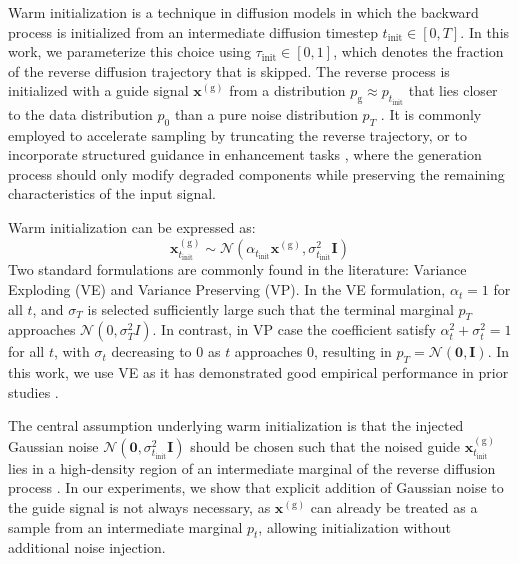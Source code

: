 \documentclass[twoside,a4paper]{article}
\begin{document}

Warm initialization is a technique in diffusion models in which the backward process is initialized from an intermediate diffusion timestep $t_\text{init} \in [0,T]$. In this work, we parameterize this choice using $\tau_{\text{init}} \in [0,1]$, which denotes the fraction of the reverse diffusion trajectory that is skipped. The reverse process is initialized with a guide signal $\mathbf{x}^{(\mathrm g)}$ from a distribution $p_\mathrm g \approx p_{t_\text{init}}$ that lies closer to the data distribution $p_0$ than a pure noise distribution $p_T$ \cite{scholzWarmStartsAccelerate2025}. It is commonly employed to accelerate sampling by truncating the reverse trajectory, or to incorporate structured guidance in enhancement tasks \cite{moliner2024buddysinglechannelblindunsupervised, moliner2024blindaudiobandwidthextension}, where the generation process should only modify degraded components while preserving the remaining characteristics of the input signal.

Warm initialization  can be expressed as:
\begin{equation}
    \mathbf{x}^{(\mathrm g)}_{t_\text{init}} \sim \mathcal{N}(\alpha_{t_\text{init}}\mathbf{x}^{(\mathrm g)}, \sigma^2_{t_\text{init}}\mathbf{I})
    \label{eq:warm_init}
\end{equation}
Two standard formulations are commonly found in the literature: Variance Exploding (VE) and Variance Preserving (VP). In the VE formulation, $\alpha_t = 1$ for all $t$, and $\sigma_T$ is selected sufficiently large such that the terminal marginal $p_T$ approaches $\mathcal{N}(0, \sigma_T^2 I)$. In contrast, in VP case the coefficient satisfy $\alpha_t^2 + \sigma_t^2 = 1$ for all $t$, with $\sigma_t$ decreasing to 0 as $t$ approaches $0$, resulting in $p_T = \mathcal{N}(\mathbf 0, \mathbf I)$.  In this work, we use VE as it has demonstrated good empirical performance in prior studies \cite{meng2022sdeditguidedimagesynthesis}.

The central assumption underlying warm initialization is that the injected Gaussian noise $\mathcal{N}(\mathbf 0, \sigma_{t_\text{init}}^2 \mathbf I)$ should be chosen such that the noised guide $\mathbf{x}^{(\mathrm g)}_{t_\text{init}}$ lies in a high-density region of an intermediate marginal of the reverse diffusion process \cite{meng2022sdeditguidedimagesynthesis}. In our experiments, we show that explicit addition of Gaussian noise to the guide signal is not always necessary, as $\mathbf{x}^{(\mathrm g)}$ can already be treated as a sample from an intermediate marginal $p_t$, allowing initialization without additional noise injection.%
\end{document}

